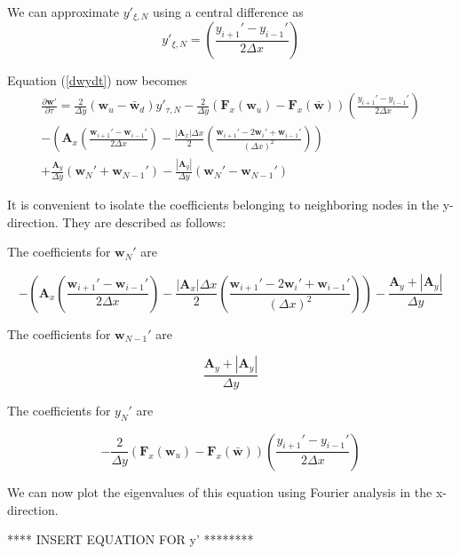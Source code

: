 \documentclass[10pt]{article}
\begin{document}
	We can approximate $y'_{\xi,N}$ using a central difference as
	\begin{equation}
		y'_{\xi,N} = \left( \frac{y_{i+1}' - y_{i-1}'}{2 \Delta x} \right)
	\end{equation}

	Equation (\ref{dwydt}) now becomes
	\begin{multline}
		\frac{\partial \mathbf{w}'}{\partial \tau} = 
		\frac{2}{\Delta y} (\mathbf{w}_u - \bar{\mathbf{w}}_d) y'_{\tau,N}
		- \frac{2}{\Delta y}(\mathbf{F}_{x}(\mathbf{w}_u) - \mathbf{F}_{x}(\bar{\mathbf{w}})) \left( \frac{y_{i+1}' - y_{i-1}'}{2 \Delta x} \right)
		\\- \left( \mathbf{A}_x \left( \frac{\mathbf{w}_{i+1}' - \mathbf{w}_{i-1}'}{2 \Delta x}\right) - \frac{|\mathbf{A}_x| \Delta x}{2} \left( \frac{\mathbf{w}_{i+1}' - 2 \mathbf{w}_i' + \mathbf{w}_{i-1}'}{(\Delta x)^2} \right) \right)
		\\ + \frac{\mathbf{A}_y}{\Delta y} (\mathbf{w}_N' + \mathbf{w}_{N-1}')
		- \frac{|\mathbf{A}_y|}{\Delta y} (\mathbf{w}_N' - \mathbf{w}_{N-1}')
	\end{multline}
	
	 It is convenient to isolate the coefficients belonging to neighboring nodes in the y-direction. They are described as follows:
	
	The coefficients for $\mathbf{w}_N'$ are
	
	$$ - \left( \mathbf{A}_x \left( \frac{\mathbf{w}_{i+1}' - \mathbf{w}_{i-1}'}{2 \Delta x}\right) - \frac{|\mathbf{A}_x| \Delta x}{2} \left( \frac{\mathbf{w}_{i+1}' - 2 \mathbf{w}_i' + \mathbf{w}_{i-1}'}{(\Delta x)^2} \right) \right) -  \frac{\mathbf{A}_y + |\mathbf{A}_y|}{\Delta y} $$
	
	The coefficients for $\mathbf{w}_{N-1}'$ are
	
	$$ \frac{\mathbf{A}_y + |\mathbf{A}_y|}{\Delta y} $$
	
	The coefficients for $y_N'$ are
	
	$$ - \frac{2}{\Delta y}(\mathbf{F}_{x}(\mathbf{w}_u) - \mathbf{F}_{x}(\bar{\mathbf{w}})) \left( \frac{y_{i+1}' - y_{i-1}'}{2 \Delta x} \right) $$
	
	We can now plot the eigenvalues of this equation using Fourier analysis in the x-direction. 
	
	**** INSERT EQUATION FOR y' ********
	
\end{document}
